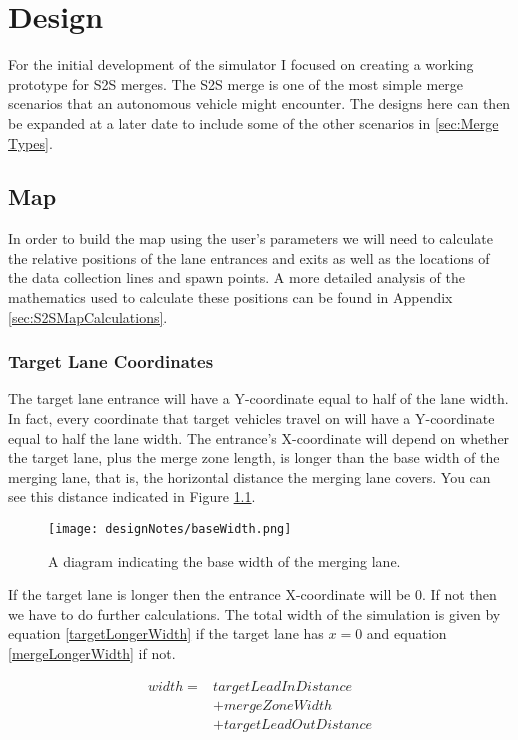 \chapter{Design}
\label{cha:Design}
For the initial development of the simulator I focused on creating a working prototype for S2S merges. The S2S merge is one of the most simple merge scenarios that an autonomous vehicle might encounter. The designs here can then be expanded at a later date to include some of the other scenarios in \ref{sec:Merge Types}.

\section{Map}
\label{sec:Map}
In order to build the map using the user's parameters we will need to calculate the relative positions of the lane entrances and exits as well as the locations of the data collection lines and spawn points. A more detailed analysis of the mathematics used to calculate these positions can be found in Appendix \ref{sec:S2SMapCalculations}.

\subsection{Target Lane Coordinates}
\label{subsec:Target Lane Coordinates}
The target lane entrance will have a Y-coordinate equal to half of the lane width. In fact, every coordinate that target vehicles travel on will have a Y-coordinate equal to half the lane width. The entrance's X-coordinate will depend on whether the target lane, plus the merge zone length, is longer than the base width of the merging lane, that is, the horizontal distance the merging lane covers. You can see this distance indicated in Figure \ref{fig:baseWidth}.

\begin{figure}[htb]
\centering
\texttt{[image: designNotes/baseWidth.png]}
\caption{A diagram indicating the base width of the merging lane.}
\label{fig:baseWidth}
\end{figure}

If the target lane is longer then the entrance X-coordinate will be $0$. If not then we have to do further calculations. The total width of the simulation is given by equation \ref{targetLongerWidth} if the target lane has $x=0$ and equation \ref{mergeLongerWidth} if not.

\begin{equation} \label{targetLongerWidth}
	\begin{split}
		width = & targetLeadInDistance \\
			    & + mergeZoneWidth \\
			    & +	targetLeadOutDistance
	\end{split}
\end{equation}

